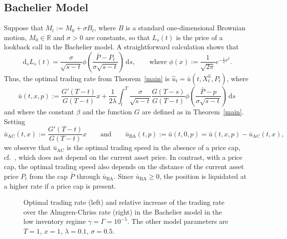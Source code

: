 \documentclass[11pt]{article}
\numberwithin{equation}{section}
\newlength\figheight
\newlength\figwidth
\theoremstyle{definition}
\theoremstyle{remark}
\newcommand{\de}{\,\mathrm{d}}
\begin{document}
\subsection{Bachelier Model}
Suppose that $M_t:=M_0 + \sigma B_t$, where $B$ is a standard one-dimensional Brownian motion, $M_0\in\mathbb R$ and $ \sigma>0$ are constants, so that $L_s(t)$ is the price of a lookback call in the Bachelier model. A straightforward calculation shows that
\[
\de_s L_s(t) = \frac{\sigma}{\sqrt{s-t}}\phi\left(\frac{\bar{P}-P_t}{\sigma\sqrt{s-t}}\right)\de s,\qquad\text{where } \phi(x):=\frac{1}{\sqrt{2\pi}}e^{-\frac{1}{2}x^2}.
\]
Thus, the optimal trading rate from Theorem~\ref{main} is $\hat{u}_t = \bar{u}(t,X^{\hat{u}}_t,P_t)$, where
\begin{equation}\label{eqn:RateBachelier}
\bar{u}(t,x,p) := \frac{G'(T-t)}{G(T-t)} x +\frac{1}{2\lambda} \int_t^T \frac{\sigma}{\sqrt{s-t}} \frac{G(T-s)}{G(T-t)} \phi\left(\frac{\bar{P}-p}{\sigma\sqrt{s-t}}\right) \de s 
\end{equation}
and where the constant $\beta$ and the function $G$ are defined as in Theorem~\ref{main}. Setting
\[
 \bar{u}_{\mathrm{AC}}(t,x) := \frac{G'(T-t)}{G(T-t)} x\qquad\text{and}\qquad \bar{u}_{\mathrm{BA}}(t,p) := \bar{u}(t,0,p) = \bar{u}(t,x,p) -  \bar{u}_{\mathrm{AC}}(t,x),
\]
we observe that $\bar{u}_{\mathrm{AC}}$ is the optimal trading speed in the absence of a price cap, cf.~\cite{almgren2001optimal}, which does not depend on the current asset price. In contrast, with a price cap, the optimal trading speed also depends on the distance of the current asset price $P_t$ from the cap $\bar{P}$ through $\bar{u}_{\mathrm{BA}}$. Since $\bar{u}_{\mathrm{BA}}\ge 0$, the position is liquidated at a higher rate if a price cap is present.  

\begin{figure}[ht]
 \setlength{}
 \setlength{}
 \centering
 \hspace{0.5em}
 
 \caption{Optimal trading rate (left) and relative increase of the trading rate over the Almgren-Chriss rate (right) in the Bachelier model in the low inventory regime $\gamma = \Gamma = 10^{-5}$. The other model parameters are  $T = 1$, $x = 1$, $\lambda = 0.1$, $\sigma = 0.5$.}
 \label{fig:Bachelier:low}
\end{figure}
\end{document}
